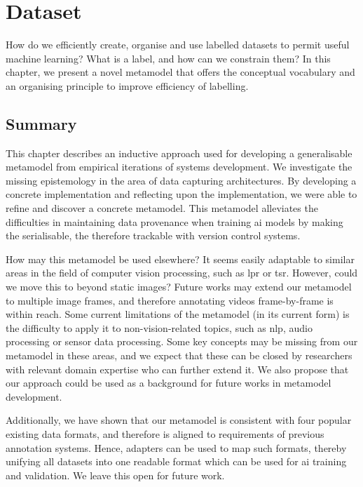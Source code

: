 \chapter{Dataset}
\label{ch:dataset}

How do we efficiently create, organise and use labelled datasets to permit useful machine learning? What is a label, and how can we constrain them? In this chapter, we present a novel metamodel that offers the conceptual vocabulary and an organising principle to improve efficiency of labelling.






\newpage
\section{Summary}

This chapter describes an inductive approach used for developing a generalisable metamodel from empirical iterations of systems development. We investigate the missing epistemology in the area of data capturing architectures. By developing a concrete implementation and reflecting upon the implementation, we were able to refine and discover a concrete metamodel. This metamodel alleviates the difficulties in maintaining data provenance when training \gls{ai} models by making the serialisable, the therefore trackable with version control systems.

How may this metamodel be used elsewhere? It seems easily adaptable to similar areas in the field of computer vision processing, such as \gls{lpr} or \gls{tsr}. However, could we move this to beyond static images? Future works may extend our metamodel to multiple image frames, and therefore annotating videos frame-by-frame is within reach. Some current limitations of the metamodel (in its current form) is the difficulty to apply it to non-vision-related topics, such as \gls{nlp}, audio processing or sensor data processing. Some key concepts may be missing from our metamodel in these areas, and we expect that these can be closed by researchers with relevant domain expertise who can further extend it. We also propose that our approach could be used as a background for future works in metamodel development.

Additionally, we have shown that our metamodel is consistent with four popular existing data formats, and therefore is aligned to requirements of previous annotation systems. Hence, adapters can be used to map such formats, thereby unifying all datasets into one readable format which can be used for \gls{ai} training and validation. We leave this open for future work.

